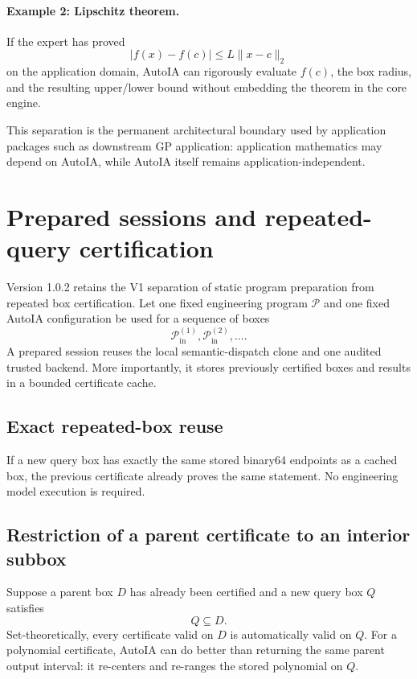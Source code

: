 \documentclass[11pt]{article}
\newcommand{\Pin}{\mathcal{P}_{\mathrm{in}}}
\begin{document}
\paragraph{Example 2: Lipschitz theorem.}
If the expert has proved
\[
  |f(x)-f(c)|\le L\|x-c\|_2
\]
on the application domain, AutoIA can rigorously evaluate \(f(c)\), the box
radius, and the resulting upper/lower bound without embedding the theorem in the
core engine.

This separation is the permanent architectural boundary used by application
packages such as downstream GP application: application mathematics may depend on AutoIA, while
AutoIA itself remains application-independent.


\section{Prepared sessions and repeated-query certification}

Version 1.0.2 retains the V1 separation of static program preparation from repeated box
certification.  Let one fixed engineering program \(\mathcal{P}\) and one fixed
AutoIA configuration be used for a sequence of boxes
\[
  \Pin^{(1)},\Pin^{(2)},\ldots.
\]
A prepared session reuses the local semantic-dispatch clone and one audited
trusted backend.  More importantly, it stores previously certified boxes and
results in a bounded certificate cache.

\subsection{Exact repeated-box reuse}

If a new query box has exactly the same stored binary64 endpoints as a cached
box, the previous certificate already proves the same statement.  No engineering
model execution is required.

\subsection{Restriction of a parent certificate to an interior subbox}

Suppose a parent box \(D\) has already been certified and a new query box \(Q\)
satisfies
\[
  Q\subseteq D.
\]
Set-theoretically, every certificate valid on \(D\) is automatically valid on
\(Q\).  For a polynomial certificate, AutoIA can do better than returning the
same parent output interval: it re-centers and re-ranges the stored polynomial on
\(Q\).
\end{document}
